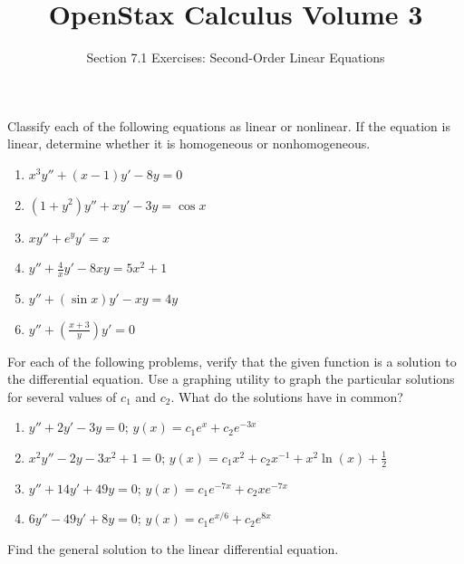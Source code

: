 \documentclass{exercises}
\title{OpenStax Calculus Volume 3}
\subtitle{Section 7.1 Exercises: Second-Order Linear Equations}
\author{}
\date{}
\begin{document}
\maketitle


Classify each of the following equations as linear or nonlinear. If the equation is linear, determine whether it is homogeneous or nonhomogeneous.

\begin{enumerate}[start=1]
\item $x^{3}y''+(x-1)y'-8y=0$
\item $(1+y^{2})y''+xy'-3y=\cos x$
\item $xy''+e^{y}y'=x$
\item $y''+\frac{4}{x}y'-8xy=5x^{2}+1$
\item $y''+(\sin x)y'-xy=4y$
\item $y''+(\frac{x+3}{y})y'=0$
\end{enumerate}

For each of the following problems, verify that the given function is a solution to the differential equation. Use a graphing utility to graph the particular solutions for several values of $c_{1}$ and $c_{2}$. What do the solutions have in common?

\begin{enumerate}[resume]
\item \techrequired$y''+2y'-3y=0$; $y(x)=c_{1}e^{x}+c_{2}e^{-3x}$
\item \techrequired$x^{2}y''-2y-3x^{2}+1=0$; $y(x)=c_{1}x^{2}+c_{2}x^{-1}+x^{2}\ln (x)+\frac{1}{2}$
\item \techrequired$y''+14y'+49y=0$; $y(x)=c_{1}e^{-7x}+c_{2}xe^{-7x}$
\item \techrequired$6y''-49y'+8y=0$; $y(x)=c_{1}e^{x/6}+c_{2}e^{8x}$
\end{enumerate}

Find the general solution to the linear differential equation.
\end{document}
